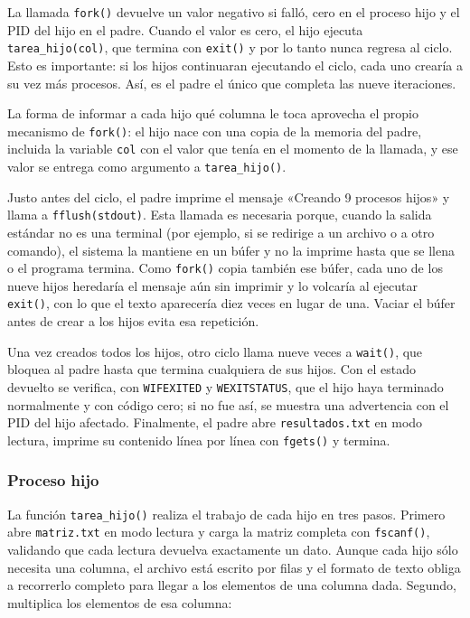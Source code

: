 La llamada \texttt{fork()} devuelve un valor negativo si falló, cero en el proceso hijo y el PID del hijo en el padre. Cuando el valor es cero, el hijo ejecuta \texttt{tarea\_hijo(col)}, que termina con \texttt{exit()} y por lo tanto nunca regresa al ciclo. Esto es importante: si los hijos continuaran ejecutando el ciclo, cada uno crearía a su vez más procesos. Así, es el padre el único que completa las nueve iteraciones.

La forma de informar a cada hijo qué columna le toca aprovecha el propio mecanismo de \texttt{fork()}: el hijo nace con una copia de la memoria del padre, incluida la variable \texttt{col} con el valor que tenía en el momento de la llamada, y ese valor se entrega como argumento a \texttt{tarea\_hijo()}.

Justo antes del ciclo, el padre imprime el mensaje «Creando 9 procesos hijos» y llama a \texttt{fflush(\allowbreak stdout)}. Esta llamada es necesaria porque, cuando la salida estándar no es una terminal (por ejemplo, si se redirige a un archivo o a otro comando), el sistema la mantiene en un búfer y no la imprime hasta que se llena o el programa termina. Como \texttt{fork()} copia también ese búfer, cada uno de los nueve hijos heredaría el mensaje aún sin imprimir y lo volcaría al ejecutar \texttt{exit()}, con lo que el texto aparecería diez veces en lugar de una. Vaciar el búfer antes de crear a los hijos evita esa repetición.

Una vez creados todos los hijos, otro ciclo llama nueve veces a \texttt{wait()}, que bloquea al padre hasta que termina cualquiera de sus hijos. Con el estado devuelto se verifica, con \texttt{WIFEXITED} y \texttt{WEXITSTATUS}, que el hijo haya terminado normalmente y con código cero; si no fue así, se muestra una advertencia con el PID del hijo afectado. Finalmente, el padre abre \texttt{resultados.txt} en modo lectura, imprime su contenido línea por línea con \texttt{fgets()} y termina.

\subsubsection{Proceso hijo}
La función \texttt{tarea\_hijo()} realiza el trabajo de cada hijo en tres pasos. Primero abre \texttt{matriz.txt} en modo lectura y carga la matriz completa con \texttt{fscanf()}, validando que cada lectura devuelva exactamente un dato. Aunque cada hijo sólo necesita una columna, el archivo está escrito por filas y el formato de texto obliga a recorrerlo completo para llegar a los elementos de una columna dada. Segundo, multiplica los elementos de esa columna:

